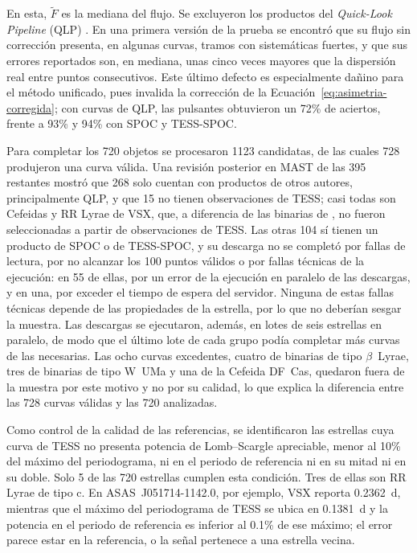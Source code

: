 \documentclass[12pt,letterpaper,oneside]{book}
\begin{document}
En esta, $\tilde F$ es la mediana del flujo. Se excluyeron los productos del \emph{Quick-Look Pipeline} (QLP) \citep{Kunimoto2021}. En una primera versi\'on de la prueba se encontr\'o que su flujo sin correcci\'on presenta, en algunas curvas, tramos con sistem\'aticas fuertes, y que sus errores reportados son, en mediana, unas cinco veces mayores que la dispersi\'on real entre puntos consecutivos. Este \'ultimo defecto es especialmente da\~nino para el m\'etodo unificado, pues invalida la correcci\'on de la Ecuaci\'on~\eqref{eq:asimetria-corregida}; con curvas de QLP, las pulsantes obtuvieron un 72\% de aciertos, frente a 93\% y 94\% con SPOC y TESS-SPOC.

Para completar los 720 objetos se procesaron 1123 candidatas, de las cuales 728 produjeron una curva v\'alida. Una revisi\'on posterior en MAST de las 395 restantes mostr\'o que 268 solo cuentan con productos de otros autores, principalmente QLP, y que 15 no tienen observaciones de TESS; casi todas son Cefeidas y RR Lyrae de VSX, que, a diferencia de las binarias de \citet{Prsa2022}, no fueron seleccionadas a partir de observaciones de TESS. Las otras 104 s\'i tienen un producto de SPOC o de TESS-SPOC, y su descarga no se complet\'o por fallas de lectura, por no alcanzar los 100 puntos v\'alidos o por fallas t\'ecnicas de la ejecuci\'on: en 55 de ellas, por un error de la ejecuci\'on en paralelo de las descargas, y en una, por exceder el tiempo de espera del servidor. Ninguna de estas fallas t\'ecnicas depende de las propiedades de la estrella, por lo que no deber\'ian sesgar la muestra. Las descargas se ejecutaron, adem\'as, en lotes de seis estrellas en paralelo, de modo que el \'ultimo lote de cada grupo pod\'ia completar m\'as curvas de las necesarias. Las ocho curvas excedentes, cuatro de binarias de tipo $\beta$~Lyrae, tres de binarias de tipo W~UMa y una de la Cefeida DF~Cas, quedaron fuera de la muestra por este motivo y no por su calidad, lo que explica la diferencia entre las 728 curvas v\'alidas y las 720 analizadas.

Como control de la calidad de las referencias, se identificaron las estrellas cuya curva de TESS no presenta potencia de Lomb--Scargle apreciable, menor al 10\% del m\'aximo del periodograma, ni en el periodo de referencia ni en su mitad ni en su doble. Solo 5 de las 720 estrellas cumplen esta condici\'on. Tres de ellas son RR Lyrae de tipo c. En ASAS~J051714-1142.0, por ejemplo, VSX reporta 0.2362~d, mientras que el m\'aximo del periodograma de TESS se ubica en 0.1381~d y la potencia en el periodo de referencia es inferior al 0.1\% de ese m\'aximo; el error parece estar en la referencia, o la se\~nal pertenece a una estrella vecina.
\end{document}
